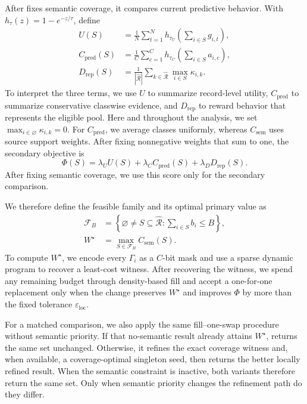  After \Fname fixes semantic
coverage, it compares current predictive behavior. With
$h_\tau(z)=1-e^{-z/\tau}$, define
\begin{align}
U(S)
&=\frac1N\sum_{t=1}^{N}
h_{\tau_U}\!\left(\sum_{i\in S}g_{i,t}\right),
\nonumber\\
C_{\mathrm{pred}}(S)
&=\frac1C\sum_{c=1}^{C}
h_{\tau_C}\!\left(\sum_{i\in S}a_{i,c}\right),
\nonumber\\
D_{\mathrm{rep}}(S)
&=\frac1{|\widehat{\mathcal R}|}
\sum_{k\in\widehat{\mathcal R}}
\max_{i\in S}\kappa_{i,k}.
\label{eq:secondary_components}
\end{align}
To interpret the three terms, we use $U$ to summarize record-level utility,
$C_{\mathrm{pred}}$ to summarize conservative classwise evidence, and
$D_{\mathrm{rep}}$ to reward behavior that represents the eligible pool.
Here and throughout the analysis, we set
$\max_{i\in\varnothing}\kappa_{i,k}=0$.
For $C_{\mathrm{pred}}$, we average classes uniformly, whereas
$C_{\mathrm{sem}}$ uses source support weights.
After fixing nonnegative weights that sum
to one, the secondary objective is
\begin{equation}
\Phi(S)=\lambda_U U(S)+\lambda_C C_{\mathrm{pred}}(S)
+\lambda_D D_{\mathrm{rep}}(S).
\label{eq:secondary_objective}
\end{equation}
After fixing semantic coverage, we use this score only for the secondary
comparison.

 We therefore define the feasible
family and its optimal primary value as
\begin{equation}
\begin{aligned}
\mathcal F_B&=\left\{
\varnothing\ne S\subseteq\widehat{\mathcal R}:
\sum_{i\in S}b_i\le B
\right\},\\
W^\star&=\max_{S\in\mathcal F_B}C_{\mathrm{sem}}(S).
\end{aligned}
\label{eq:primary_value}
\end{equation}
To compute $W^\star$, we encode every $\Gamma_i$ as a $C$-bit mask and use a
sparse dynamic program to recover a least-cost witness. After recovering the
witness, we spend any remaining budget through density-based fill and accept a
one-for-one replacement only when the change preserves $W^\star$ and improves
$\Phi$ by more than the fixed tolerance $\varepsilon_{\mathrm{loc}}$.

For a matched comparison, we also apply the same
fill--one-swap procedure without semantic priority. If that no-semantic
result already attains $W^\star$, \Fname returns the same set unchanged.
Otherwise, it refines the exact coverage witness and, when available, a
coverage-optimal singleton seed, then returns the better locally refined
result. When the semantic constraint is inactive, both variants therefore
return the same set. Only when semantic priority changes the refinement path
do they differ.


